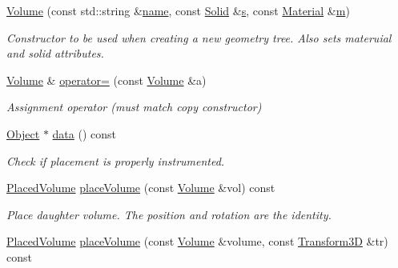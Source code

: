 \begin{DoxyCompactItemize}
\hyperlink{class_d_d4hep_1_1_geometry_1_1_volume_aa03cf0a05a1f926bd4fb605178ae39ce}{Volume} (const std\+::string \&\hyperlink{class_d_d4hep_1_1_handle_a27c7d467a609ab32c133e1f3c7d85ef5}{name}, const \hyperlink{namespace_d_d4hep_1_1_geometry_a83de90a8dcc7378ba47d54ef9a6a687b}{Solid} \&\hyperlink{_volumes_8cpp_a17ca6bfc8040d695d3cada22a4763d40}{s}, const \hyperlink{class_d_d4hep_1_1_geometry_1_1_material}{Material} \&\hyperlink{_volumes_8cpp_a6fc379aaec47ce424b00d8ffda2a6c59}{m})
\begin{DoxyCompactList}\small\item\em Constructor to be used when creating a new geometry tree. Also sets materuial and solid attributes. \end{DoxyCompactList}\item 
\hyperlink{class_d_d4hep_1_1_geometry_1_1_volume}{Volume} \& \hyperlink{class_d_d4hep_1_1_geometry_1_1_volume_af071e34d365d16c7f7dfe5b2fe59d520}{operator=} (const \hyperlink{class_d_d4hep_1_1_geometry_1_1_volume}{Volume} \&a)
\begin{DoxyCompactList}\small\item\em Assignment operator (must match copy constructor) \end{DoxyCompactList}\item 
\hyperlink{class_d_d4hep_1_1_geometry_1_1_volume_a12968f95257e99e277f773ccf6d58ee5}{Object} $\ast$ \hyperlink{class_d_d4hep_1_1_geometry_1_1_volume_a0e888def458bf5d98a55fc57f2e01aac}{data} () const
\begin{DoxyCompactList}\small\item\em Check if placement is properly instrumented. \end{DoxyCompactList}\item 
\hyperlink{class_d_d4hep_1_1_geometry_1_1_placed_volume}{Placed\+Volume} \hyperlink{class_d_d4hep_1_1_geometry_1_1_volume_a6c42869a9a111bbad79e8f0f5813b16b}{place\+Volume} (const \hyperlink{class_d_d4hep_1_1_geometry_1_1_volume}{Volume} \&vol) const
\begin{DoxyCompactList}\small\item\em Place daughter volume. The position and rotation are the identity. \end{DoxyCompactList}\item 
\hyperlink{class_d_d4hep_1_1_geometry_1_1_placed_volume}{Placed\+Volume} \hyperlink{class_d_d4hep_1_1_geometry_1_1_volume_a6ab8b32c9172875c1629126f469dd1fe}{place\+Volume} (const \hyperlink{class_d_d4hep_1_1_geometry_1_1_volume}{Volume} \&volume, const \hyperlink{namespace_d_d4hep_1_1_geometry_aeb4c0356d12fd7be49a0aae50514e64b}{Transform3D} \&tr) const

\end{DoxyCompactItemize}
